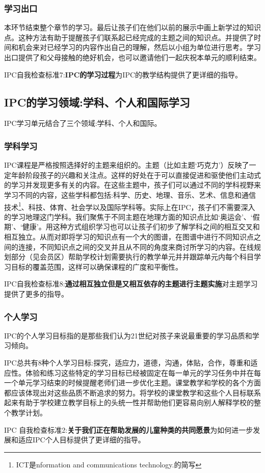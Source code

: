 \subsubsection{学习出口}
    本环节结束整个章节的学习。最后让孩子们在他们以前的展示中画上新学过的知识点。这种方法有助于提醒孩子们联系起已经完成的主题之间的知识点。并提供了时间和机会来对已经学习的内容作出自己的理解，然后以小组为单位进行思考。学习出口提供了和父母接触的绝好机会，也可以邀请他们一起庆祝本单元的顺利结束。 \par

    IPC自我检查标准7:\textbf{IPC的学习过程}为IPC的教学结构提供了更详细的指导。


\subsection{IPC的学习领域:学科、个人和国际学习}
   IPC学习单元结合了三个领域:学科、个人和国际。

\subsubsection{学科学习}
    IPC课程是严格按照选择好的主题来组织的。主题（比如主题‘巧克力’）反映了一定年龄阶段孩子的兴趣和关注点。这样的好处在于可以直接促进和驱使他们主动式的学习并发现更多有关的内容。在这些主题中，孩子们可以通过不同的学科视野来学习不同的内容，这些学科都包括:科学、历史、地理、音乐、艺术、信息和通信技术\footnote{ICT是nformation and communications technology.的简写}、科技、体育、社会学以及国际学科等。实际上在IPC，孩子们不需要深入的学习地理这门学科。我们聚焦于不同主题在地理方面的知识点比如‘奥运会’、‘假期’、‘健康’。用这种方式组织学习也可以让孩子们初步了解学科之间的相互交叉和相互独立。从而对即将学习的知识点有一个大的图谱，在图谱中进行不同知识点之间的连接，不同知识点之间的交叉并且从不同的角度来商讨所学习的内容。在线规划部分（见会员区）帮助学校计划需要执行的教学单元并并跟踪单元内每个科目学习目标的覆盖范围，这样可以确保课程的广度和平衡性。\par
    IPC自我检查标准8:\textbf{通过相互独立但是又相互依存的主题进行主题实施}对主题学习提供了更多的指导。

\subsubsection{个人学习}  
    IPC的个人学习目标指的是那些我们认为21世纪对孩子来说最重要的学习品质和学习倾向。\par
    IPC总共有8种个人学习目标:探究，适应力，道德，沟通，体贴，合作，尊重和适应性。体验和练习这些特定的学习目标已经被固定在每一单元的学习任务中并在每一个单元学习结束的时候提醒老师们进一步优化主题。课堂教学和学校的各个方面都应该体现出对这些品质不断追求的努力。将学校的课堂教学和这些个人目标联系起来有助于学校建立教学目标上的头统一性并帮助他们更容易向别人解释学校的整个教学计划。   \par
    IPC 自我检查标准2:\textbf{关于我们正在帮助发展的儿童种类的共同愿景}为如何进一步发展和适应IPC个人目标提供了更详细的指导。    

